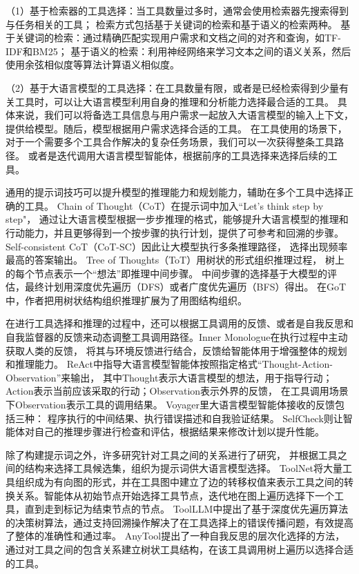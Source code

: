 （1）基于检索器的工具选择：当工具数量过多时，通常会使用检索器先搜索得到与任务相关的工具；
检索方式包括基于关键词的检索和基于语义的检索两种。
基于关键词的检索：通过精确匹配实现用户需求和文档之间的对齐和查询，如TF-IDF\cite{Jones1972}和BM25\cite{Robertson2009}；
基于语义的检索：利用神经网络来学习文本之间的语义关系，然后使用余弦相似度等算法计算语义相似度。

（2）基于大语言模型的工具选择：在工具数量有限，或者是已经检索得到少量有关工具时，可以让大语言模型利用自身的推理和分析能力选择最合适的工具。
具体来说，我们可以将备选工具信息与用户需求一起放入大语言模型的输入上下文，提供给模型。随后，模型根据用户需求选择合适的工具。
在工具使用的场景下，对于一个需要多个工具合作解决的复杂任务场景，我们可以一次获得整条工具路径。
或者是迭代调用大语言模型智能体，根据前序的工具选择来选择后续的工具。

通用的提示词技巧可以提升模型的推理能力和规划能力，辅助在多个工具中选择正确的工具。
Chain of Thought（CoT）\cite{Wang2023a}在提示词中加入“Let's think step by step"，
通过让大语言模型根据一步步推理的格式，能够提升大语言模型的推理和行动能力，并且更够得到一个按步骤的执行计划，提供了可参考和回溯的步骤。
Self-consistent CoT（CoT-SC）\cite{wang2022self}因此让大模型执行多条推理路径，
选择出现频率最高的答案输出。
Tree of Thoughts（ToT）\cite{Yao2023a}用树状的形式组织推理过程，
树上的每个节点表示一个“想法”即推理中间步骤。
中间步骤的选择基于大模型的评估，最终计划用深度优先遍历（DFS）或者广度优先遍历（BFS）得出。
在GoT\cite{Besta2023}中，作者把用树状结构组织推理扩展为了用图结构组织。

在进行工具选择和推理的过程中，还可以根据工具调用的反馈、或者是自我反思和自我监督器的反馈来动态调整工具调用路径。Inner Monologue\cite{Huang2022}在执行过程中主动获取人类的反馈，
将其与环境反馈进行结合，反馈给智能体用于增强整体的规划和推理能力。
ReAct\cite{Yao2023b}中指导大语言模型智能体按照指定格式“Thought-Action-Observation”来输出，
其中Thought表示大语言模型的想法，用于指导行动；Action表示当前应该采取的行动；Observation表示外界的反馈，
在工具调用场景下Observation表示工具的调用结果。
Voyager\cite{Wang2023b}里大语言模型智能体接收的反馈包括三种：
程序执行的中间结果、执行错误描述和自我验证结果。
SelfCheck\cite{Miao2023}则让智能体对自己的推理步骤进行检查和评估，根据结果来修改计划以提升性能。

除了构建提示词之外，许多研究针对工具之间的关系进行了研究，
并根据工具之间的结构来选择工具候选集，组织为提示词供大语言模型选择。
ToolNet\cite{Liu2024}将大量工具组织成为有向图的形式，并在工具图中建立了边的转移权值来表示工具之间的转换关系。智能体从初始节点开始选择工具节点，迭代地在图上遍历选择下一个工具，直到走到标记为结束节点的节点。
ToolLLM\cite{Qin2023}中提出了基于深度优先遍历算法的决策树算法，通过支持回溯操作解决了在工具选择上的错误传播问题，有效提高了整体的准确性和通过率。
AnyTool\cite{Du2024}提出了一种自我反思的层次化选择的方法，通过对工具之间的包含关系建立树状工具结构，在该工具调用树上遍历以选择合适的工具。

